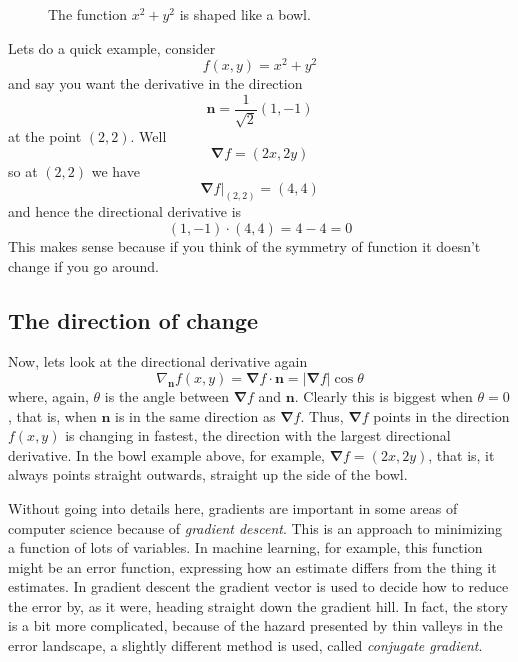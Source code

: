 \documentclass[12pt]{article}
\begin{document}
\begin{figure}
\begin{center}

\end{center}
\caption{The function $x^2+y^2$ is shaped like a bowl.}
\end{figure}

Lets do a quick example, consider 
\begin{equation}
f(x,y)=x^2+y^2
\end{equation}
and say you want the derivative in the direction
\begin{equation}
\mathbf{n}=\frac{1}{\sqrt{2}}(1,-1)
\end{equation}
at the point $(2,2)$. Well
\begin{equation}
\mathbf{\nabla}f=\left(2x,2y\right)
\end{equation}
so at $(2,2)$ we have 
\begin{equation}
\mathbf{\nabla}f|_{(2,2)}=\left(4,4\right)
\end{equation}
and hence the directional derivative is 
\begin{equation}
(1,-1)\cdot(4,4)=4-4=0
\end{equation}
This makes sense because if you think of the symmetry of function it
doesn't change if you go around. 

\subsection*{The direction of change}

Now, lets look at the directional derivative again
\begin{equation}
\nabla_{\mathbf{n}}f(x,y)=\mathbf{\nabla}f\cdot \mathbf{n}=|\mathbf{\nabla}f|\cos{\theta}
\end{equation}
 where, again, $\theta$ is the angle between $\mathbf{\nabla}f$ and
 $\mathbf{n}$. Clearly this is biggest when $\theta=0$, that is, when
 $\mathbf{n}$ is in the same direction as $\mathbf{\nabla}f$. Thus,
 $\mathbf{\nabla}f$ points in the direction $f(x,y)$ is changing in
 fastest, the direction with the largest directional derivative. In
 the bowl example above, for example, $\mathbf{\nabla}f=(2x,2y)$, that
 is, it always points straight outwards, straight up the side of the
 bowl.

Without going into details here, gradients are important in some areas
of computer science because of \textsl{gradient descent}. This is an
approach to minimizing a function of lots of variables. In machine
learning, for example, this function might be an error function,
expressing how an estimate differs from the thing it estimates. In
gradient descent the gradient vector is used to decide how to reduce
the error by, as it were, heading straight down the gradient hill. In
fact, the story is a bit more complicated, because of the hazard
presented by thin valleys in the error landscape, a slightly different
method is used, called \textsl{conjugate gradient}.
\end{document}
